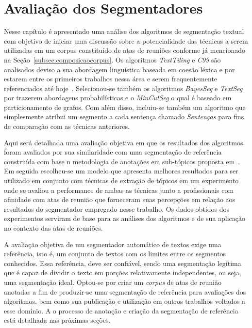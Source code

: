 \chapter{Avaliação dos Segmentadores}\label{cap-segmentadores}




Nesse capítulo é apresentado uma análise dos algoritmos de segmentação textual com objetivo de iniciar uma discussão sobre a potencialidade das técnicas a serem utilizadas em um corpus constituído de atas de reuniões conforme já mencionado na Seção~\ref{subsec:composicaocorpus}. 
Os algoritmos \textit{TextTiling} e \textit{C99} são analisados deviso a sua abordagem linguística baseada em coesão léxica e por estarem entre os primeiros trabalhos nessa área e serem frequentemente referenciados até hoje~\cite{AlemiG15}. 
%	
Selecionou-se também os algoritmos \textit{BayesSeg} e \textit{TextSeg} por trazerem abordagens probabilísticas e o \textit{MinCutSeg} o qual é baseado em particionamento de grafos.
% 
Com além disso, incluiu-se também um algoritmo que simplesmente atribui um segmento a cada sentença chamado \textit{Sentenças} para fins de comparação com as técnicas anteriores.


Aqui será detalhada uma avaliação objetiva em que os resultados dos algoritmos foram avaliados por sua similaridade com uma segmentação de referência construída com base n metodologia de anotações em sub-tópicos proposta em~\cite{Hovy2010}. Em seguida escolheu-se um modelo que apresenta melhores resultados para ser utilizado em conjunto com técnicas de extração de tópicos em um experimento onde se avaliou a performance de ambas as técnicas junto a profissionais com afinidade com atas de reunião que forneceram suas percepções em relação aos resultados do segmentador empregado nesse trabalho. Os dados obtidos dos experimentos serviram de base para as análises dos algoritmos e de sua aplicação no contexto das atas de reuniões.




A avaliação objetiva de um segmentador automático de textos exige uma referência, isto é, um conjunto de textos com os limites entre os segmentos conhecidos. Essa referência, deve ser confiável, sendo uma segmentação legítima que é capaz de dividir o texto em porções relativamente independentes, ou seja, uma segmentação ideal.
Optou-se por criar um \textit{corpus} de atas de reunião anotadas a fim de produzir-se uma segmentação de referência para avaliações dos algoritmos, bem como sua publicação e utilização em outros trabalhos voltados a esse domínio. A o processo de anotação e criação da segmentação de referência está detalhada nas próximas seções.


